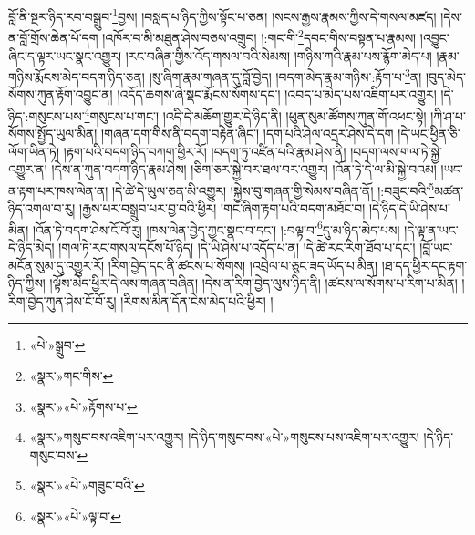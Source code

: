 བློ་ནི་སྔར་ཉིད་རབ་བསྒྲུབ་\footnote{«པེ་»སྒྲུབ་}བྱས། །བསླད་པ་ཉིད་ཀྱིས་སྟོང་པ་ཅན། །སངས་རྒྱས་རྣམས་ཀྱིས་དེ་གསལ་མཛད། །དེས་ན་བློ་གྲོས་ཆེན་པོ་དག །འཁོར་བ་མི་མཐུན་ཤེས་བཅས་འགྲུབ། །:གང་གི་\footnote{«སྣར་»གང་གིས་}དབང་གིས་བསྟན་པ་རྣམས། །འབྱུང་ཞིང་ད་ལྟར་ཡང་སྣང་འགྱུར། །རང་བཞིན་གྱིས་འོད་གསལ་བའི་སེམས། །གཉིས་ཀའི་རྣམ་པས་རྙོག་མེད་པ། །རྣམ་གཉིས་རྨོངས་མེད་བདག་ཉིད་ཅན། །སུ་ཞིག་རྣམ་གཞན་དུ་བློ་བྱེད། །བདག་མེད་རྣམ་གཉིས་:རྟོག་པ་\footnote{«སྣར་»«པེ་»རྟོགས་པ་}ན། །བུད་མེད་སོགས་ཀུན་རྟོག་འབྱུང་ན། །འདོད་ཆགས་ཞེ་སྡང་རྨོངས་སོགས་དང་། །འབད་པ་མེད་པས་འཇིག་པར་འགྱུར། །དེ་ཉིད་:གསུངས་པས་\footnote{«སྣར་»གསུང་བས་འཇིག་པར་འགྱུར། །དེ་ཉིད་གསུང་བས་«པེ་»གསུངས་པས་འཇིག་པར་འགྱུར། །དེ་ཉིད་གསུང་བས་}གསུངས་པ་གང་། །འདི་དེ་མཆོག་གྱུར་དེ་ཉིད་ནི། །ཕུན་སུམ་ཚོགས་ཀུན་གོ་འཕང་སྟེ། །ཀི་ཤ་པ་སོགས་སྤྱོད་ཡུལ་མིན། །གཞན་དག་གིས་ནི་བདག་བརྟེན་ཞིང་། །དག་པའི་ཤེལ་འདྲར་ཤེས་དེ་དག །དེ་ཡང་ཕྱིན་ཅི་ལོག་ཡིན་ཏེ། །རྟག་པའི་བདག་ཉིད་བཀག་ཕྱིར་རོ། །བདག་ཏུ་འཛིན་པའི་རྣམ་ཤེས་ནི། །བདག་ལས་གལ་ཏེ་སྐྱེ་འགྱུར་ན། །དེས་ན་ཀུན་བདག་ཉིད་རྣམ་ཤེས། །ཅིག་ཅར་སྐྱེ་བར་ཐལ་བར་འགྱུར། །འོན་ཏེ་དེ་ལ་མི་སྐྱེ་བའམ། །ཡང་ན་རྟག་པར་ཁས་ལེན་ན། །དེ་ཚེ་དེ་ཡུལ་ཅན་མི་འགྱུར། །སྐྱེས་བུ་གཞན་གྱི་སེམས་བཞིན་ནོ། །:བཟུང་བའི་\footnote{«སྣར་»«པེ་»གཟུང་བའི་}མཚན་ཉིད་འགལ་བ་རུ། །རྒྱས་པར་བསྒྲུབ་པར་བྱ་བའི་ཕྱིར། །གང་ཞིག་རྟག་པའི་བདག་མཐོང་བ། །དེ་ཉིད་དེ་ཡི་ཤེས་པ་མིན། །འོན་ཏེ་བདག་ཤེས་ངོ་བོ་རུ། །ཁས་ལེན་བྱེད་ཀྱང་སྣང་བ་དང་། །:བལྟ་བ་\footnote{«སྣར་»«པེ་»ལྟ་བ་}དུ་མ་ཉིད་མེད་པས། །དེ་ལྟ་ན་ཡང་དེ་ཉིད་མེད། །གལ་ཏེ་རང་གསལ་དངོས་པོ་ཉིད། །དེ་ཡི་ཤེས་པ་འདོད་པ་ན། །དེ་ཚེ་རང་རིག་ཐོབ་པ་དང་། །བློ་ཡང་མངོན་སུམ་དུ་འགྱུར་རོ། །རིག་བྱེད་དང་ནི་ཚངས་པ་སོགས། །འབྲེལ་པ་ཅུང་ཟད་ཡོད་པ་མིན། །ཐ་དད་ཕྱིར་དང་རྟག་ཉིད་ཀྱིས། །ལྟོས་མེད་ཕྱིར་དེ་ལས་གཞན་བཞིན། །དེས་ན་རིག་བྱེད་ལུས་ཉིད་ནི། །ཚངས་ལ་སོགས་པ་རིག་པ་མིན། །རིག་བྱེད་ཀུན་ཤེས་ངོ་བོ་རུ། །རིགས་མིན་དོན་ངེས་མེད་པའི་ཕྱིར། །
